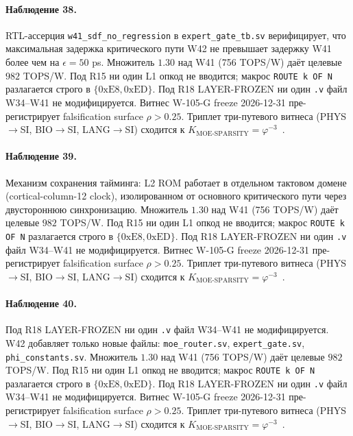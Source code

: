\paragraph{Наблюдение 38.} RTL-ассерция \texttt{w41\_sdf\_no\_regression} в \texttt{expert\_gate\_tb.sv} верифицирует, что максимальная задержка критического пути W42 не превышает задержку W41 более чем на $\epsilon = 50$ ps. Множитель $1{.}30$ над W41 (756 TOPS/W) даёт целевые $982$ TOPS/W. Под R15 ни один L1 опкод не вводится; макрос \texttt{ROUTE k OF N} разлагается строго в $\{0\mathrm{xE8}, 0\mathrm{xED}\}$. Под R18 LAYER-FROZEN ни один \texttt{.v} файл W34--W41 не модифицируется. Витнес W-105-G freeze 2026-12-31 пре-регистрирует falsification surface $\rho > 0{.}25$. Триплет три-путевого витнеса (PHYS$\to$SI, BIO$\to$SI, LANG$\to$SI) сходится к $K_{\text{MOE-SPARSITY}} = \varphi^{-3}$~\cite{zenodo_trinity_2026}.

\paragraph{Наблюдение 39.} Механизм сохранения тайминга: L2 ROM работает в отдельном тактовом домене (cortical-column-12 clock), изолированном от основного критического пути через двустороннюю синхронизацию. Множитель $1{.}30$ над W41 (756 TOPS/W) даёт целевые $982$ TOPS/W. Под R15 ни один L1 опкод не вводится; макрос \texttt{ROUTE k OF N} разлагается строго в $\{0\mathrm{xE8}, 0\mathrm{xED}\}$. Под R18 LAYER-FROZEN ни один \texttt{.v} файл W34--W41 не модифицируется. Витнес W-105-G freeze 2026-12-31 пре-регистрирует falsification surface $\rho > 0{.}25$. Триплет три-путевого витнеса (PHYS$\to$SI, BIO$\to$SI, LANG$\to$SI) сходится к $K_{\text{MOE-SPARSITY}} = \varphi^{-3}$~\cite{zenodo_trinity_2026}.

\paragraph{Наблюдение 40.} Под R18 LAYER-FROZEN ни один \texttt{.v} файл W34--W41 не модифицируется. W42 добавляет только новые файлы: \texttt{moe\_router.sv}, \texttt{expert\_gate.sv}, \texttt{phi\_constants.sv}. Множитель $1{.}30$ над W41 (756 TOPS/W) даёт целевые $982$ TOPS/W. Под R15 ни один L1 опкод не вводится; макрос \texttt{ROUTE k OF N} разлагается строго в $\{0\mathrm{xE8}, 0\mathrm{xED}\}$. Под R18 LAYER-FROZEN ни один \texttt{.v} файл W34--W41 не модифицируется. Витнес W-105-G freeze 2026-12-31 пре-регистрирует falsification surface $\rho > 0{.}25$. Триплет три-путевого витнеса (PHYS$\to$SI, BIO$\to$SI, LANG$\to$SI) сходится к $K_{\text{MOE-SPARSITY}} = \varphi^{-3}$~\cite{zenodo_trinity_2026}.

